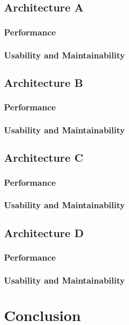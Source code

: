 \documentclass{article}
\begin{document}
\subsection{Architecture A}
\subsubsection{Performance}

\subsubsection{Usability and Maintainability}

\subsection{Architecture B}
\subsubsection{Performance}

\subsubsection{Usability and Maintainability}

\subsection{Architecture C}
\subsubsection{Performance}

\subsubsection{Usability and Maintainability}

\subsection{Architecture D}
\subsubsection{Performance}

\subsubsection{Usability and Maintainability}

\section{Conclusion}
\end{document}
